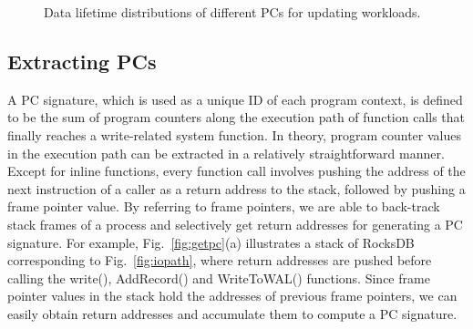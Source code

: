 \begin{figure}[t]
\centering
\hfill
	\hspace{2pt}
\hfill
\vspace{7pt}
	\hspace{2pt}
\caption{Data lifetime distributions of different PCs for updating workloads.} 
\label{fig:updating_PCs}
\end{figure}


\subsection{Extracting PCs}
A PC signature, which is used as a unique ID of each program context,
is defined
to be the sum of program counters along the execution path of function calls
that finally reaches a write-related system function.  In theory, program
counter values in the execution path can be extracted in a relatively
straightforward manner.  Except for inline functions, every function call
involves pushing the address of the next instruction of a caller as a return
address to the stack, followed by pushing a frame pointer value.  By referring
to frame pointers, we are able to back-track stack frames of a process and
selectively get return addresses for generating a PC signature.
For example, Fig.~\ref{fig:getpc}(a) illustrates a stack of RocksDB corresponding
to Fig.~\ref{fig:iopath}, where return addresses are pushed before calling
the \textsf{\small  write()}, \textsf{\small AddRecord()} and \textsf{\small
WriteToWAL()} functions.  Since frame pointer values in the stack hold the
addresses of previous frame pointers, we can easily obtain return addresses and
accumulate them to compute a PC signature.  

